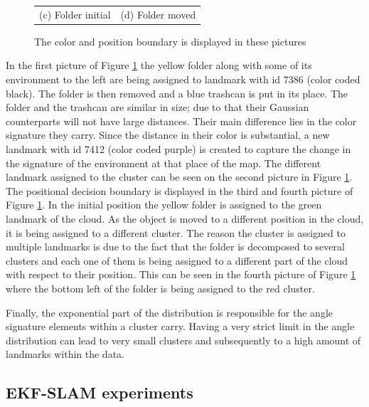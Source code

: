 \documentclass [twoside,hidelinks]{article}
\begin{document}
\begin{figure}
\begin{tabular}{cc}
 (c) Folder initial  &  (d) Folder moved \\ [6pt]
\end{tabular}
\caption{The color and position boundary is displayed in these pictures}
  \label{pip:bounds}
\end{figure}

In the first picture of Figure \ref{pip:bounds} the yellow folder along with some of its environment to the left are being assigned to landmark with id 7386 (color coded black). The folder is then removed and a blue trashcan is put in its place. The folder and the trashcan are similar in size; due to that their Gaussian counterparts will not have large distances. Their main difference lies in the color signature they carry. Since the distance in their color is substantial, a new landmark with id 7412 (color coded purple) is created to capture the change in the signature of the environment at that place of the map. The different landmark assigned to the cluster can be seen on the second picture in Figure \ref{pip:bounds}. The positional decision boundary is displayed in the third and fourth picture of Figure \ref{pip:bounds}. In the initial position the yellow folder is assigned to the green landmark of the cloud. As the object is moved to a different position in the cloud, it is being assigned to a different cluster. The reason the cluster is assigned to multiple landmarks is due to the fact that the folder is decomposed to several clusters and each one of them is being assigned to a different part of the cloud with respect to their position. This can be seen in the fourth picture of Figure \ref{pip:bounds} where the bottom left of the folder is being assigned to the red cluster.

Finally, the exponential part of the distribution is responsible for the angle signature elements within a cluster carry. Having a very strict limit in the angle distribution can lead to very small clusters and subsequently to a high amount of landmarks within the data.

\subsection{EKF-SLAM experiments}
\end{document}
